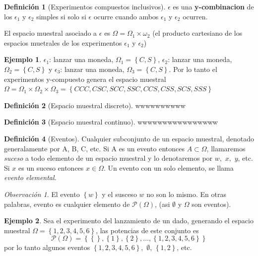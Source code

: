 \documentclass[
  11pt,
]{krantz}
\theoremstyle{definition}
\newtheorem{definition}{Definición}[chapter]
\theoremstyle{definition}
\newtheorem{example}{Ejemplo}[chapter]
\theoremstyle{definition}
\theoremstyle{definition}
\theoremstyle{remark}
\newtheorem*{remark}{Observación}
\begin{document}
\begin{definition}[Experimentos compuestos inclusivos]
\(\epsilon\) es una \textbf{y-combinacion} de los \(\epsilon_1\) y \(\epsilon_2\) simples si solo si \(\epsilon\) ocurre cuando ambos \(\epsilon_1\) y \(\epsilon_2\) ocurren.

El espacio muestral asociado a \(\epsilon\) es \(\Omega=\Omega_1\times \omega_2\) (el producto cartesiano de los espacios muetrales de los experimentos \(\epsilon_1\) y \(\epsilon_2\))
\end{definition}

\begin{example}
\(\epsilon_1\): lanzar una moneda, \(\Omega_1=\left\{C,S\right\}\), \(\epsilon_2\): lanzar una moneda, \(\Omega_2=\left\{C,S\right\}\) y \(\epsilon_3\): lanzar una moneda, \(\Omega_3=\left\{C,S\right\}\). Por lo tanto el experimentos y-compuesto genera el espacio muestral \(\Omega=\Omega_1\times\Omega_2\times\Omega_3=\left\{CCC,CSC,SCC,SSC,CCS,CSS,SCS,SSS\right\}\)
\end{example}

\begin{definition}[Espacio muestral discreto]
wwwwwwwwww
\end{definition}

\begin{definition}[Espacio muestral continuo]
wwwwwwwwwwwwwwww
\end{definition}

\begin{definition}[Eventos]
Cualquier subconjunto de un espacio muestral, denotado generalamente por A, B, C, etc. Si A es un evento entonces \(A\subset \Omega\), llamaremos \emph{suceso} a todo elemento de un espacio muestral y lo denotaremos por \(w,\) \(x,\) \(y\), etc. Si \(x\) es un suceso entonces \(x\in \Omega\). Un evento con un solo elemento, se llama \emph{evento elemental}.
\end{definition}

\begin{remark}
El evento \(\left\{w\right\}\) y el susceso \(w\) no son lo mismo. En otras palabras, evento es cualquier elemento de \(\mathcal{P}(\Omega)\), (asi \(\emptyset\) y \(\Omega\) son eventos).
\end{remark}

\begin{example}
Sea el experimento del lanzamiento de un dado, generando el espacio muestral \(\Omega=\left\{1,2,3,4,5,6\right\}\), las potencias de este conjunto es \[\mathcal{P}(\Omega)= \left\{\left\{\right\},
\left\{1\right\},
\left\{2\right\},
\ldots,
\left\{1,2,3,4,5,6\right\}
\right\}\]
por lo tanto algunos eventos \(\left\{1,2,3,4,5,6\right\},\) \(\emptyset\), \(\left\{1,2\right\}\), etc.
\end{example}
\end{document}
